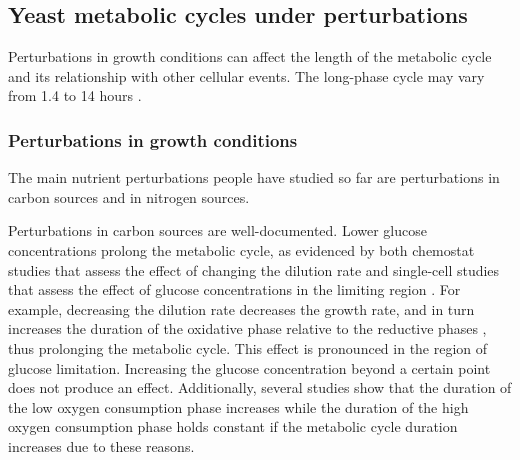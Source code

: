 \subsection{Yeast metabolic cycles under perturbations}
\label{subsec:intro-ymc-perturbations}

Perturbations in growth conditions can affect the length of the metabolic cycle and its relationship with other cellular events.
The long-phase cycle may vary from 1.4 to 14 hours \citep{caustonMetabolicRhythmsFramework2018}.

\subsubsection{Perturbations in growth conditions}
\label{subsubsec:intro-ymc-perturbations-nutrient}

The main nutrient perturbations people have studied so far are perturbations in carbon sources and in nitrogen sources.

Perturbations in carbon sources are well-documented.
Lower glucose concentrations prolong the metabolic cycle, as evidenced by both chemostat studies that assess the effect of changing the dilution rate \parencite{burnettiCellCycleStart2016, oneillEukaryoticCellBiology2020} and single-cell studies that assess the effect of glucose concentrations in the limiting region \parencite{papagiannakisAutonomousMetabolicOscillations2017}.
For example, decreasing the dilution rate decreases the growth rate, and in turn increases the duration of the oxidative phase relative to the reductive phases \citep{slavovCouplingGrowthRate2011}, thus prolonging the metabolic cycle.
This effect is pronounced in the region of glucose limitation.
Increasing the glucose concentration beyond a certain point does not produce an effect.
Additionally, several studies \citep{slavovCouplingGrowthRate2011,oneillEukaryoticCellBiology2020} show that the duration of the low oxygen consumption phase increases while the duration of the high oxygen consumption phase holds constant if the metabolic cycle duration increases due to these reasons.

